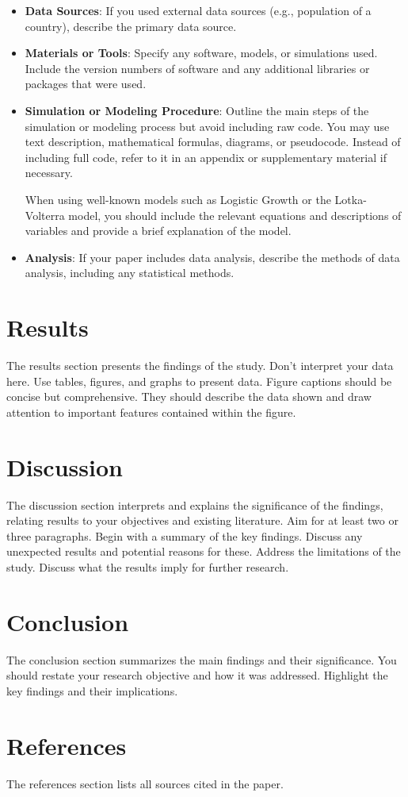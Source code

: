 \documentclass[a4paper,12pt]{article}
\begin{document}
\begin{itemize}
    \item \textbf{Data Sources}: If you used external data sources (e.g., population of a country), describe the primary data source.
    \item \textbf{Materials or Tools}: Specify any software, models, or simulations used. Include the version numbers of software and any additional libraries or packages that were used.
    \item \textbf{Simulation or Modeling Procedure}: Outline the main steps of the simulation or modeling process but avoid including raw code. You may use text description, mathematical formulas, diagrams, or pseudocode. Instead of including full code, refer to it in an appendix or supplementary material if necessary.
    
    When using well-known models such as Logistic Growth or the Lotka-Volterra model, you should include the relevant equations and descriptions of variables and provide a brief explanation of the model.
    \item \textbf{Analysis}: If your paper includes data analysis, describe the methods of data analysis, including any statistical methods.
\end{itemize}

\section{Results}
The results section presents the findings of the study. Don't interpret your data here. Use tables, figures, and graphs to present data. Figure captions should be concise but comprehensive. They should describe the data shown and draw attention to important features contained within the figure.

\section{Discussion}
The discussion section interprets and explains the significance of the findings, relating results to your objectives and existing literature. Aim for at least two or three paragraphs. Begin with a summary of the key findings. Discuss any unexpected results and potential reasons for these. Address the limitations of the study. Discuss what the results imply for further research.

\section{Conclusion}
The conclusion section summarizes the main findings and their significance. You should restate your research objective and how it was addressed. Highlight the key findings and their implications.

\section{References}
The references section lists all sources cited in the paper.

\end{document}
